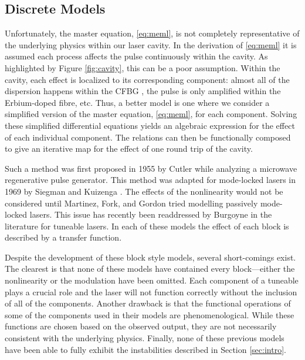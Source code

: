 \documentclass[10pt,twocolumn,a4paper]{article}
\begin{document}
\subsection{Discrete Models}
\label{sec:discrete}
Unfortunately, the master equation, \eqref{eq:meml}, is not completely representative of the underlying physics within our laser cavity. In the derivation of \eqref{eq:meml} it is assumed each process affects the pulse continuously within the cavity. As highlighted by Figure \ref{fig:cavity}, this can be a poor assumption. Within the cavity, each effect is localized to its corresponding component: almost all of the dispersion happens within the CFBG \cite{agrawal2002}, the pulse is only amplified within the Erbium-doped fibre, etc. Thus, a better model is one where we consider a simplified version of the master equation, \eqref{eq:meml}, for each component. Solving these simplified differential equations yields an algebraic expression for the effect of each individual component. The relations can then be functionally composed to give an iterative map for the effect of one round trip of the cavity.

Such a method was first proposed in 1955 by Cutler \cite{cutler1955} while analyzing a microwave regenerative pulse generator. This method was adapted for mode-locked lasers in 1969 by Siegman and Kuizenga \cite{kuizenga1970a, kuizenga1970b, kuizenga1970, siegman1969}. The effects of the nonlinearity would not be considered until Martinez, Fork, and Gordon \cite{martinez1984, martinez1985} tried modelling passively mode-locked lasers. This issue has recently been readdressed by Burgoyne \cite{burgoyne2014} in the literature for tuneable lasers. In each of these models the effect of each block is described by a transfer function.

Despite the development of these block style models, several short-comings exist. The clearest is that none of these models have contained every block---either the nonlinearity or the modulation have been omitted. Each component of a tuneable plays a crucial role and the laser will not function correctly without the inclusion of all of the components. Another drawback is that the functional operations of some of the components used in their models are phenomenological. While these functions are chosen based on the observed output, they are not necessarily consistent with the underlying physics. Finally, none of these previous models have been able to fully exhibit the instabilities described in Section \ref{sec:intro}.
\end{document}
